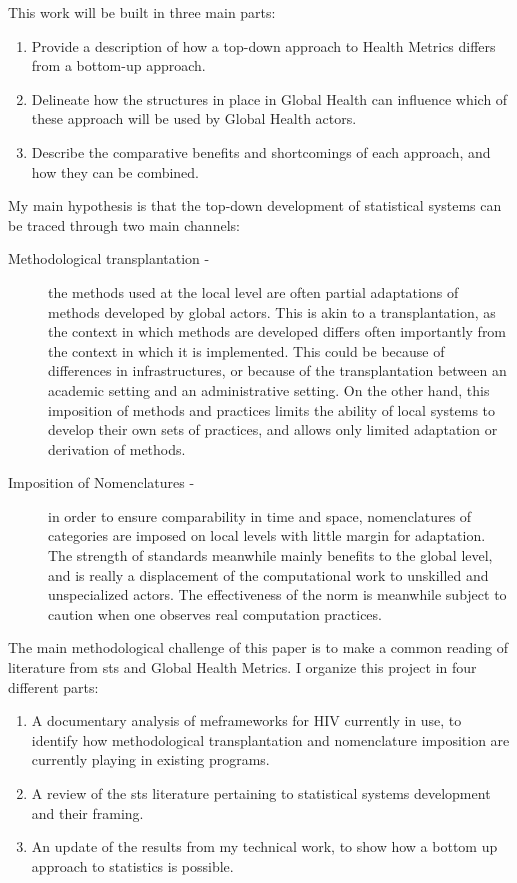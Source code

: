 This work will be built in three main parts:

\begin{enumerate}
\item Provide a description of how a top-down approach to Health Metrics differs from a bottom-up approach.
\item Delineate how the structures in place in Global Health can influence which of these approach will be used by Global Health actors.
\item Describe the comparative benefits and shortcomings of each approach, and how they can be combined.
\end{enumerate}

My main hypothesis is that the top-down development of statistical systems can be traced through two main channels:
\begin{description}
\item[Methodological transplantation -] the methods used at the local level are often partial adaptations of methods developed by global actors. This is akin to a transplantation, as the context in which methods are developed differs often importantly from the context in which it is implemented. This could be because of differences in infrastructures, or because of the transplantation between an academic setting and an administrative setting. On the other hand, this imposition of methods and practices limits the ability of local systems to develop their own sets of practices, and allows only limited adaptation or derivation of methods.
\item[Imposition of Nomenclatures - ] in order to ensure comparability in time and space, nomenclatures of categories are imposed on local levels with little margin for adaptation. The strength of standards meanwhile mainly benefits to the global level, and is really a displacement of the computational work to unskilled and unspecialized actors. The effectiveness of the norm is meanwhile subject to caution when one observes real computation practices.
\end{description}


The main methodological challenge of this paper is to make a common reading of literature from \gls{sts} and Global Health Metrics.  I organize this project in four different parts:

\begin{enumerate}
\item A documentary analysis of \gls{me}frameworks for HIV currently in use, to identify how methodological transplantation and nomenclature imposition are currently playing in existing programs.
\item A review of the \gls{sts} literature pertaining to statistical systems development and their framing.
\item An update of the results from my technical work, to show how a bottom up approach to statistics is possible.
\end{enumerate}

